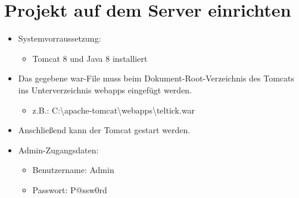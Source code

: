 \documentclass[12pt, a4paper]{article}
\begin{document}
\section{Projekt auf dem Server einrichten}
\begin{itemize}
\item Systemvorraussetzung:
\begin{itemize}
	\item Tomcat 8 und Java 8 installiert
\end{itemize}
\item Das gegebene war-File muss beim Dokument-Root-Verzeichnis des Tomcats ins Unterverzeichnis \glqq webapps\grqq{} eingefügt werden.
\begin{itemize}
	\item z.B.: \glqq C:\textbackslash{}apache-tomcat\textbackslash{}webapps\textbackslash{}teltick.war\grqq{}
\end{itemize}
\item Anschließend kann der Tomcat gestart werden.
\item Admin-Zugangsdaten:
  \begin{itemize}
         \item Benutzername: Admin
         \item Passwort: P@ssw0rd
      \end{itemize}


\end{itemize}




\end{document}
